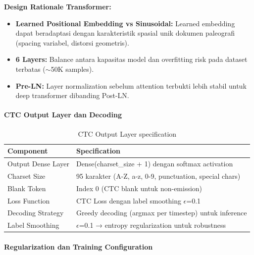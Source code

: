 \documentclass[12pt,a4paper]{article}
\begin{document}
\textbf{Design Rationale Transformer:}
\begin{itemize}[nosep]
    \item \textbf{Learned Positional Embedding vs Sinusoidal:} Learned embedding dapat beradaptasi dengan karakteristik spasial unik dokumen paleografi (spacing variabel, distorsi geometris).
    \item \textbf{6 Layers:} Balance antara kapasitas model dan overfitting risk pada dataset terbatas ($\sim$50K samples).
    \item \textbf{Pre-LN:} Layer normalization sebelum attention terbukti lebih stabil untuk deep transformer dibanding Post-LN.
\end{itemize}

\paragraph{CTC Output Layer dan Decoding}

\begin{table}[H]
\centering
\caption{CTC Output Layer specification}
\label{tab:recognizer-ctc-spec}
\small
\begin{tabular}{|l|p{10cm}|}
\hline
\textbf{Component} & \textbf{Specification} \\
\hline
Output Dense Layer & Dense(charset\_size + 1) dengan softmax activation \\
\hline
Charset Size & 95 karakter (A-Z, a-z, 0-9, punctuation, special chars) \\
\hline
Blank Token & Index 0 (CTC blank untuk non-emission) \\
\hline
Loss Function & CTC Loss dengan label smoothing $\epsilon$=0.1 \\
\hline
Decoding Strategy & Greedy decoding (argmax per timestep) untuk inference \\
\hline
Label Smoothing & $\epsilon$=0.1 → entropy regularization untuk robustness \\
\hline
\end{tabular}
\end{table}

\paragraph{Regularization dan Training Configuration}
\end{document}
